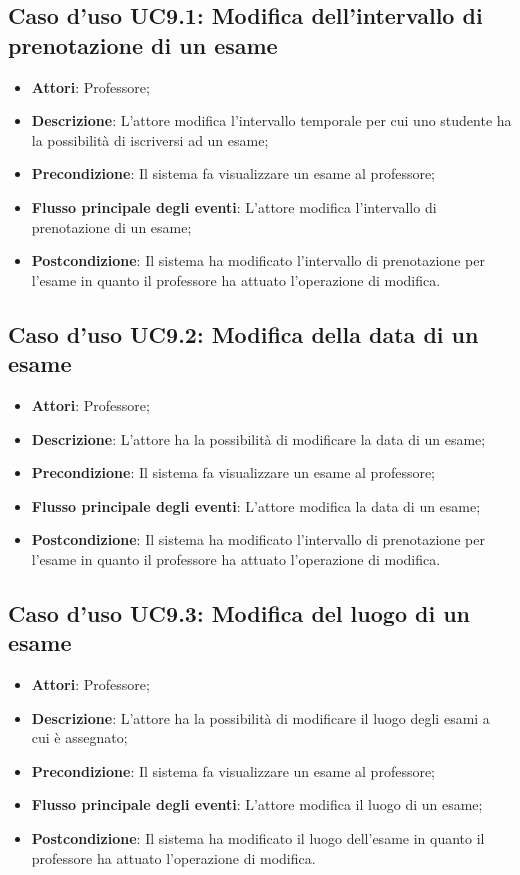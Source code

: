 \subsection{Caso d'uso \texorpdfstring{UC9.1}{UC9.1}: Modifica dell'intervallo di prenotazione di un esame}
\begin{itemize}
	\item \textbf{Attori}: Professore;
	\item \textbf{Descrizione}: L'attore modifica l'intervallo temporale per cui uno studente ha la possibilità di iscriversi ad un esame;
	\item \textbf{Precondizione}: Il sistema fa visualizzare un esame al professore;
	
	
	\item \textbf{Flusso principale degli eventi}: L'attore modifica l'intervallo di prenotazione di un esame;
	\item \textbf{Postcondizione}: Il sistema ha modificato l'intervallo di prenotazione per l’esame in quanto il professore ha attuato l'operazione di modifica.
	
\end{itemize}
\subsection{Caso d'uso \texorpdfstring{UC9.2}{UC9.2}: Modifica della data di un esame}
\begin{itemize}
	\item \textbf{Attori}: Professore;
	\item \textbf{Descrizione}: L'attore ha la possibilità di modificare la data di un esame;
	\item \textbf{Precondizione}: Il sistema fa visualizzare un esame al professore;
	
	\item \textbf{Flusso principale degli eventi}: L'attore modifica la data di un esame;
	\item \textbf{Postcondizione}: Il sistema ha modificato l'intervallo di prenotazione per l’esame in quanto il professore ha attuato l'operazione di modifica.
	
\end{itemize}
\subsection{Caso d'uso \texorpdfstring{UC9.3}{UC9.3}: Modifica del luogo di un esame}
\begin{itemize}
	\item \textbf{Attori}: Professore;
	\item \textbf{Descrizione}: L'attore ha la possibilità di modificare il luogo degli esami a cui è assegnato;
	\item \textbf{Precondizione}: Il sistema fa visualizzare un esame al professore;
	
	\item \textbf{Flusso principale degli eventi}: L'attore modifica il luogo di un esame;
	\item \textbf{Postcondizione}: Il sistema ha modificato il luogo dell'esame in quanto il professore ha attuato l'operazione di modifica.
	
\end{itemize}
